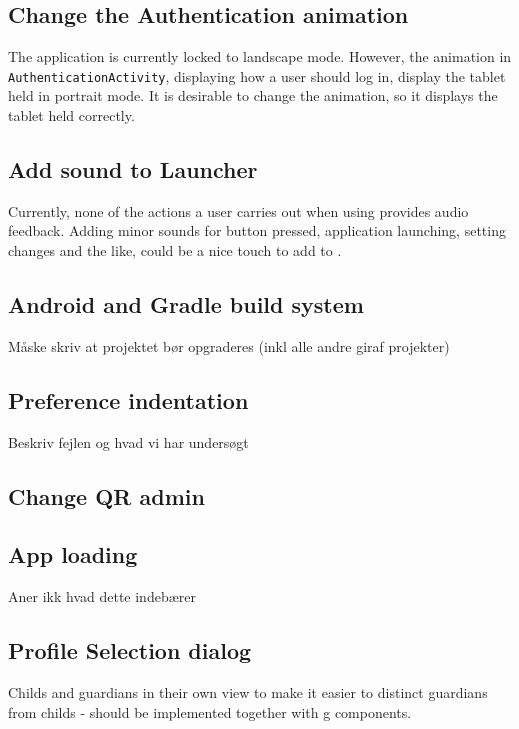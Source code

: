 \subsection{Change the Authentication animation}
The application is currently locked to landscape mode.
However, the animation in \lstinline!AuthenticationActivity!, displaying how a user should log in, display the tablet held in portrait mode.
It is desirable to change the animation, so it displays the tablet held correctly.

\subsection{Add sound to Launcher}
Currently, none of the actions a user carries out when using \launcher provides audio feedback.
Adding minor sounds for button pressed, application launching, setting changes and the like, could be a nice touch to add to \launcher. 

\subsection{Android and Gradle build system}
Måske skriv at projektet bør opgraderes (inkl alle andre giraf projekter)

\subsection{Preference indentation}
Beskriv fejlen og hvad vi har undersøgt

\subsection{Change QR admin}

\subsection{App loading}
Aner ikk hvad dette indebærer

\subsection{Profile Selection dialog}
Childs and guardians in their own view to make it easier to distinct guardians from childs - should be implemented together with g components.